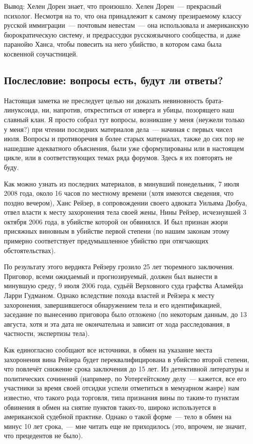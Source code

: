 Вывод: Хелен Дорен знает, что произошло. Хелен Дорен~--- прекрасный психолог. Несмотря на то, что она принадлежит к самому презираемому классу русской иммиграции~--- почтовым невестам~--- она использовала и американскую бюрократическую систему, и предрассудки русскоязычного сообщества, и даже паранойю Ханса, чтобы повесить на него убийство, в котором сама была косвенной соучастницей. 

\subsection{Послесловие: вопросы есть, будут ли ответы?}

Настоящая заметка не преследует целью ни доказать невиновность брата-линуксоида, ни, напротив, откреститься от изверга и убицы, позорящего наш славный клан. Я просто собрал тут вопросы, возникшие у меня (неужели только у меня?) при чтении последних материалов дела~--- начиная с первых чисел июля. Вопросы и противоречия в более старых материалах, также до сих пор не нашедшие адекватного объяснения, были уже сформулированы или в настоящем цикле, или в соответствующих темах ряда форумов. Здесь я их повторять не буду. 

Как можно узнать из последних материалов, в минувший понедельник, 7 июля 2008 года, около 16 часов по местному времени (хотя имеются сведения, что поздно вечером), Ханс Рейзер, в сопровождении своего адвоката Уильяма Дюбуа, отвел власти к месту захоронения тела своей жены, Нины Рейзер, исчезнувшей 3 октября 2006 года, в убийстве которой он обвинялся. И был признан жюри присяжных виновным в убийстве первой степени (по нашим законам этому примерно соответствует предумышленное убийство при отягчающих обстоятельствах). 

По результату этого вердикта Рейзеру грозило 25 лет тюремного заключения. Приговор, всеми ожидаемый и прогнозируемый, должен был вынести в минувшую среду, 9 июля 2006 года, судьёй Верховного суда графства Аламейда Ларри Гудманом. Однако вследствие похода властей и Рейзера к месту захоронения, завершившегося обнаружением тела и его идентификацией, заседание по вынесению приговора было отложено (по некоторым данным, до 13 августа, хотя и эта дата не окончательна и зависит от хода расследования, в частности, экспертизы тела). 

Как единогласно сообщают все источники, в обмен на указание места захоронения вина Рейзера будет переквалифицирована в убийство второй степени, что повлечёт снижение срока заключения до 15 лет. Из детективной литературы и политических сочинений (например, по Уотергейтскому делу~--- кажется, все его участники за время своей отсидки успели отметиться в мемуарном жанре) нам известно, что такого рода торговля, типа признания вины по таким-то пунктам обвинения в обмен на снятие пунктов таких-то, широко используется в американской судебной практике. Однако о такой форме~--- тело в обмен на минус 10 лет срока,~--- мне читать еще не приходилось (это, впрочем, не значит, что прецедентов не было). 

